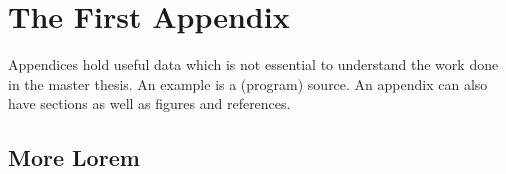 \chapter{The First Appendix}
\label{app:A}
Appendices hold useful data which is not essential to understand the work
done in the master thesis. An example is a (program) source.
An appendix can also have sections as well as figures and references.

\section{More Lorem}


